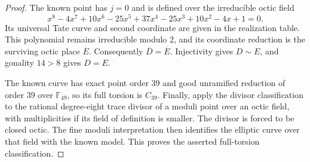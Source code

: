 \begin{proof}
The known point has $j=0$ and is defined over the irreducible octic field
\[
 x^8-4x^7+10x^6-25x^5+37x^4-25x^3+10x^2-4x+1=0.
\]
Its universal Tate curve and second coordinate are given in the
realization table. This polynomial remains irreducible modulo $2$,
and its coordinate reduction is the surviving octic place $\overline E$.
Consequently $\overline D=\overline E$. Injectivity gives $D\sim E$,
and gonality $14>8$ gives $D=E$.

The known curve has exact point order $39$ and good unramified
reduction of order $39$ over $\mathbb F_{49}$, so its full torsion is
$C_{39}$. Finally, apply the divisor classification to the rational
degree-eight trace divisor of a moduli point over an octic field,
with multiplicities if its field of definition is smaller. The
divisor is forced to be closed octic. The fine moduli interpretation
then identifies the elliptic curve over that field with the known
model. This proves the asserted full-torsion classification.
\end{proof}
